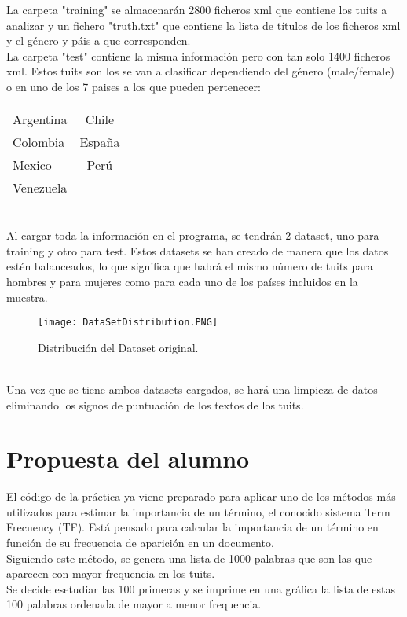\documentclass[11pt,a4paper]{article}
\begin{document}
La carpeta "training" se almacenarán 2800 ficheros xml que contiene los tuits a analizar y un fichero "truth.txt" que contiene la lista de títulos de los ficheros xml y el género y páis a que corresponden.\\

La carpeta "test" contiene la misma información pero con tan solo 1400 ficheros xml.
Estos tuits son los se van a clasificar dependiendo del género (male/female) o en uno de los 7 paises a los que pueden pertenecer:\\
\begin{tabular}{ l c }
   Argentina & Chile  \\
   Colombia & España  \\
   Mexico & Perú  \\
   Venezuela
 \end{tabular}\\
 
Al cargar toda la información en el programa, se tendrán 2 dataset, uno para training y otro para test.
Estos datasets se han creado de manera que los datos estén balanceados, lo que significa que habrá el mismo número de tuits
para hombres y para mujeres como para cada uno de los países incluidos en la muestra.
\begin{figure}[htb]
\centering
\texttt{[image: DataSetDistribution.PNG]}
\caption{Distribución del Dataset original.}
\label{fig:PAN-AP'17}
\end{figure}\\

Una vez que se tiene ambos datasets cargados, se hará una limpieza de datos eliminando los signos de puntuación de los textos de los tuits.

\section{Propuesta del alumno}
El código de la práctica ya viene preparado para aplicar uno de los métodos más utilizados para estimar la importancia de un término, el conocido sistema Term Frecuency (TF). Está pensado para calcular la importancia de un término en función de su frecuencia de aparición en un documento.\\

Siguiendo este método, se genera una lista de 1000 palabras que son las que aparecen con mayor frequencia en los tuits.\\
Se decide esetudiar las 100 primeras y se imprime en una gráfica la lista de estas 100 palabras ordenada de mayor a menor frequencia.\\
\end{document}
